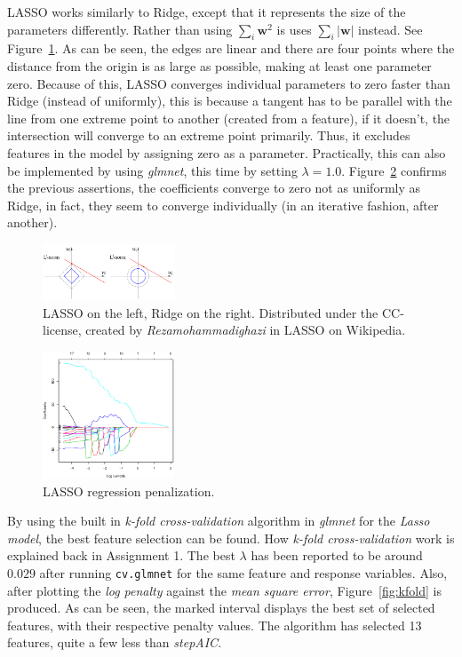 \documentclass[a4paper, twocolumn]{article}
\begin{document}
        LASSO works similarly to Ridge, except that it represents the size of the parameters differently. Rather than using $\sum_{i}{\mathbf{w}^2}$ is uses $\sum_{i}{|\mathbf{w}|}$ instead. See Figure~\ref{fig:shape}. As can be seen, the edges are linear and there are four points where the distance from the origin is as large as possible, making at least one parameter zero. Because of this, LASSO converges individual parameters to zero faster than Ridge (instead of uniformly), this is because a tangent has to be parallel with the line from one extreme point to another (created from a feature), if it doesn't, the intersection will converge to an extreme point primarily. Thus, it excludes features in the model by assigning zero as a parameter. Practically, this can also be implemented by using \emph{glmnet}, this time by setting $\lambda = 1.0$. Figure~\ref{fig:lasso} confirms the previous assertions, the coefficients converge to zero not as uniformly as Ridge, in fact, they seem to converge individually (in an iterative fashion, after another).

    \begin{figure}[h!]
        \centering
        \caption{LASSO on the left, Ridge on the right. Distributed under the CC-license, created by \emph{Rezamohammadighazi} in LASSO on Wikipedia.}
        \label{fig:shape}
        \includegraphics[width=0.35\textwidth]{share/shape.jpg}
    \end{figure}

    \begin{figure}[h!]
        \centering
        \caption{LASSO regression penalization.}
        \label{fig:lasso}
        \includegraphics[width=0.35\textwidth]{share/lasso.eps}
    \end{figure}

        By using the built in \emph{k-fold cross-validation} algorithm in \emph{glmnet} for the \emph{Lasso model}, the best feature selection can be found. How \emph{k-fold cross-validation} work is explained back in Assignment 1. The best $\lambda$ has been reported to be around $0.029$ after running \texttt{cv.glmnet} for the same feature and response variables. Also, after plotting the \emph{log penalty} against the \emph{mean square error}, Figure~\ref{fig:kfold} is produced. As can be seen, the marked interval displays the best set of selected features, with their respective penalty values. The algorithm has selected 13 features, quite a few less than \emph{stepAIC}.
\end{document}
